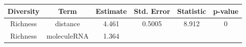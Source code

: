 \documentclass[]{article}
\begin{document}
\begin{longtable}[]{@{}cccccc@{}}
\toprule
\begin{minipage}[b]{0.12\columnwidth}\centering\strut
Diversity\strut
\end{minipage} & \begin{minipage}[b]{0.24\columnwidth}\centering\strut
Term\strut
\end{minipage} & \begin{minipage}[b]{0.11\columnwidth}\centering\strut
Estimate\strut
\end{minipage} & \begin{minipage}[b]{0.14\columnwidth}\centering\strut
Std. Error\strut
\end{minipage} & \begin{minipage}[b]{0.12\columnwidth}\centering\strut
Statistic\strut
\end{minipage} & \begin{minipage}[b]{0.09\columnwidth}\centering\strut
p-value\strut
\end{minipage}\tabularnewline
\midrule
\endhead
\begin{minipage}[t]{0.12\columnwidth}\centering\strut
Richness\strut
\end{minipage} & \begin{minipage}[t]{0.24\columnwidth}\centering\strut
distance\strut
\end{minipage} & \begin{minipage}[t]{0.11\columnwidth}\centering\strut
4.461\strut
\end{minipage} & \begin{minipage}[t]{0.14\columnwidth}\centering\strut
0.5005\strut
\end{minipage} & \begin{minipage}[t]{0.12\columnwidth}\centering\strut
8.912\strut
\end{minipage} & \begin{minipage}[t]{0.09\columnwidth}\centering\strut
0\strut
\end{minipage}\tabularnewline
\begin{minipage}[t]{0.12\columnwidth}\centering\strut
Richness\strut
\end{minipage} & \begin{minipage}[t]{0.24\columnwidth}\centering\strut
moleculeRNA\strut
\end{minipage} & \begin{minipage}[t]{0.11\columnwidth}\centering\strut
1.364\strut
\end{minipage} & \begin{minipage}[t]{0.14\columnwidth}\centering\strut

\end{minipage}
\end{longtable}
\end{document}
